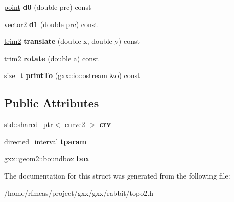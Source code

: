 \begin{DoxyCompactItemize}
\item 
\hyperlink{classmalgo_1_1vector2}{point} {\bfseries d0} (double prc) const \hypertarget{structrabbit_1_1trim2_aece0eb1e4c0c2a8a87fe7874ec93fc5e}{}\label{structrabbit_1_1trim2_aece0eb1e4c0c2a8a87fe7874ec93fc5e}

\item 
\hyperlink{classmalgo_1_1vector2}{vector2} {\bfseries d1} (double prc) const \hypertarget{structrabbit_1_1trim2_acecfe6cb29c0c4bd9ba32f4ca6bed560}{}\label{structrabbit_1_1trim2_acecfe6cb29c0c4bd9ba32f4ca6bed560}

\item 
\hyperlink{structrabbit_1_1trim2}{trim2} {\bfseries translate} (double x, double y) const \hypertarget{structrabbit_1_1trim2_a0493d5ee83ffebc90aa6ac82958a45e0}{}\label{structrabbit_1_1trim2_a0493d5ee83ffebc90aa6ac82958a45e0}

\item 
\hyperlink{structrabbit_1_1trim2}{trim2} {\bfseries rotate} (double a) const \hypertarget{structrabbit_1_1trim2_af5b7c73dd2a0541fc4f7047adf1a0369}{}\label{structrabbit_1_1trim2_af5b7c73dd2a0541fc4f7047adf1a0369}

\item 
size\+\_\+t {\bfseries print\+To} (\hyperlink{classgxx_1_1io_1_1ostream}{gxx\+::io\+::ostream} \&o) const \hypertarget{structrabbit_1_1trim2_a97e754434655af9c5bfcf272ff74665d}{}\label{structrabbit_1_1trim2_a97e754434655af9c5bfcf272ff74665d}

\end{DoxyCompactItemize}
\subsection*{Public Attributes}
\begin{DoxyCompactItemize}
\item 
std\+::shared\+\_\+ptr$<$ \hyperlink{classgxx_1_1geom2_1_1curve}{curve2} $>$ {\bfseries crv}\hypertarget{structrabbit_1_1trim2_af1d71182421bf8fffd438cf3b19dbb2e}{}\label{structrabbit_1_1trim2_af1d71182421bf8fffd438cf3b19dbb2e}

\item 
\hyperlink{structgxx_1_1math_1_1directed__interval}{directed\+\_\+interval} {\bfseries tparam}\hypertarget{structrabbit_1_1trim2_a95dd8d1eb62b968ef23e83e136f38317}{}\label{structrabbit_1_1trim2_a95dd8d1eb62b968ef23e83e136f38317}

\item 
\hyperlink{structgxx_1_1geom2_1_1boundbox}{gxx\+::geom2\+::boundbox} {\bfseries box}\hypertarget{structrabbit_1_1trim2_ac552b9a45c107bfde76b365652508f5a}{}\label{structrabbit_1_1trim2_ac552b9a45c107bfde76b365652508f5a}

\end{DoxyCompactItemize}


The documentation for this struct was generated from the following file\+:\begin{DoxyCompactItemize}
\item 
/home/rfmeas/project/gxx/gxx/rabbit/topo2.\+h\end{DoxyCompactItemize}
